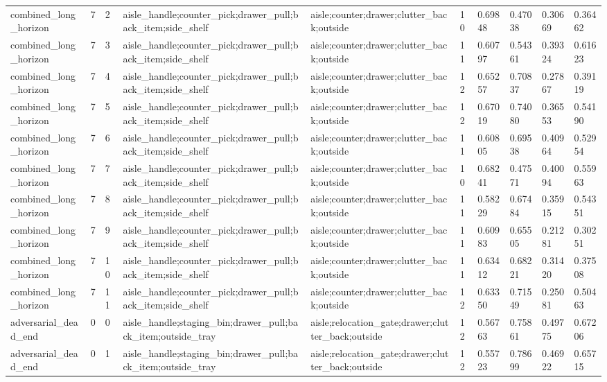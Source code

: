 \documentclass{article}
\begin{document}
\begin{table}[tbp]
{\begin{tabular}{llllllllll}
combined\_long\_horizon & 7 & 2 & aisle\_handle;counter\_pick;drawer\_pull;back\_item;side\_shelf & aisle;counter;drawer;clutter\_back;outside & 10 & 0.69848 & 0.47038 & 0.30669 & 0.36462 \\
combined\_long\_horizon & 7 & 3 & aisle\_handle;counter\_pick;drawer\_pull;back\_item;side\_shelf & aisle;counter;drawer;clutter\_back;outside & 11 & 0.60797 & 0.54361 & 0.39324 & 0.61623 \\
combined\_long\_horizon & 7 & 4 & aisle\_handle;counter\_pick;drawer\_pull;back\_item;side\_shelf & aisle;counter;drawer;clutter\_back;outside & 12 & 0.65257 & 0.70837 & 0.27867 & 0.39119 \\
combined\_long\_horizon & 7 & 5 & aisle\_handle;counter\_pick;drawer\_pull;back\_item;side\_shelf & aisle;counter;drawer;clutter\_back;outside & 12 & 0.67019 & 0.74080 & 0.36553 & 0.54190 \\
combined\_long\_horizon & 7 & 6 & aisle\_handle;counter\_pick;drawer\_pull;back\_item;side\_shelf & aisle;counter;drawer;clutter\_back;outside & 11 & 0.60805 & 0.69538 & 0.40964 & 0.52954 \\
combined\_long\_horizon & 7 & 7 & aisle\_handle;counter\_pick;drawer\_pull;back\_item;side\_shelf & aisle;counter;drawer;clutter\_back;outside & 10 & 0.68241 & 0.47571 & 0.40094 & 0.55963 \\
combined\_long\_horizon & 7 & 8 & aisle\_handle;counter\_pick;drawer\_pull;back\_item;side\_shelf & aisle;counter;drawer;clutter\_back;outside & 11 & 0.58229 & 0.67484 & 0.35915 & 0.54351 \\
combined\_long\_horizon & 7 & 9 & aisle\_handle;counter\_pick;drawer\_pull;back\_item;side\_shelf & aisle;counter;drawer;clutter\_back;outside & 11 & 0.60983 & 0.65505 & 0.21281 & 0.30251 \\
combined\_long\_horizon & 7 & 10 & aisle\_handle;counter\_pick;drawer\_pull;back\_item;side\_shelf & aisle;counter;drawer;clutter\_back;outside & 11 & 0.63412 & 0.68221 & 0.31420 & 0.37508 \\
combined\_long\_horizon & 7 & 11 & aisle\_handle;counter\_pick;drawer\_pull;back\_item;side\_shelf & aisle;counter;drawer;clutter\_back;outside & 12 & 0.63350 & 0.71549 & 0.25081 & 0.50463 \\
adversarial\_dead\_end & 0 & 0 & aisle\_handle;staging\_bin;drawer\_pull;back\_item;outside\_tray & aisle;relocation\_gate;drawer;clutter\_back;outside & 12 & 0.56763 & 0.75861 & 0.49775 & 0.67206 \\
adversarial\_dead\_end & 0 & 1 & aisle\_handle;staging\_bin;drawer\_pull;back\_item;outside\_tray & aisle;relocation\_gate;drawer;clutter\_back;outside & 12 & 0.55723 & 0.78699 & 0.46922 & 0.65715 \\
\bottomrule
\end{tabular}
}
\end{table}
\end{document}
